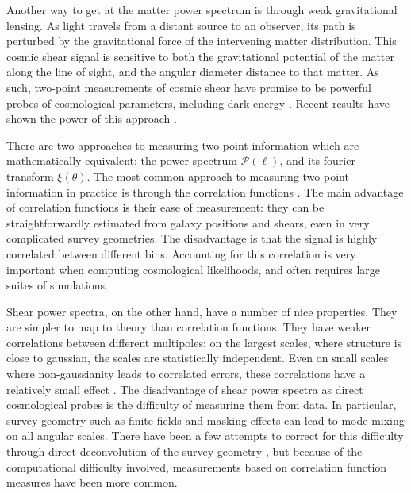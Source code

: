 Another way to get at the matter power spectrum is through weak gravitational
lensing.  As light travels from a distant source to an observer, its path is
perturbed by the gravitational force of the intervening matter distribution.
This cosmic shear signal is sensitive to both the gravitational potential
of the matter along the line of sight, and the angular diameter distance
to that matter.  As such, two-point measurements of cosmic shear have promise
to be powerful probes of cosmological parameters, including dark energy
\citep[see][]{Takada07}.  Recent results have shown the power of this
approach \citep{Ichiki09, Schrabback10}.

There are two approaches to measuring two-point information which are 
mathematically equivalent: the power spectrum $\mathcal{P}(\ell)$,
and its fourier transform $\xi(\theta)$.
The most common approach to measuring two-point information in practice
is through the correlation functions \citep[see][]{Schneider02}.
The main advantage of correlation functions is their ease of measurement:
they can be straightforwardly estimated from galaxy positions and shears,
even in very complicated survey geometries.  The disadvantage is that the
signal is highly correlated between different bins.  Accounting for this 
correlation is very important when computing cosmological likelihoods,
and often requires large suites of simulations.

Shear power spectra, on the other hand, have a number of nice properties.
They are simpler to map to theory than correlation functions.  They have
weaker correlations between different multipoles: on the largest scales,
where structure is close to gaussian, the scales are statistically independent.
Even on small scales where non-gaussianity leads to correlated errors,
these correlations have a relatively small effect \citep{Takada09}.
The disadvantage of shear power spectra as direct cosmological probes is
the difficulty of measuring them from data.  In particular, survey geometry
such as finite fields and masking effects can lead to mode-mixing on all
angular scales.  There have been a few attempts to correct for this
difficulty through direct deconvolution of the survey geometry
\citep{Brown03, Hikage11}, but because of the computational difficulty
involved, measurements based on correlation function measures have been
more common.

